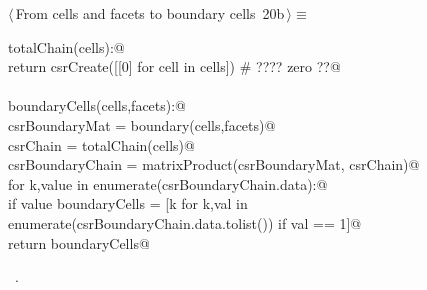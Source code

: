 \documentclass[11pt,oneside]{article}	%
\begin{document}
\begin{flushleft} \small \label{scrap36}
\protect{}$\langle\,$From cells and facets to boundary cells\nobreak\ {\footnotesize 20b}$\,\rangle\equiv$
\vspace{-1ex}
\begin{list}{}{} \item
\mbox{}\verb@def totalChain(cells):@\\
\mbox{}\verb@   return csrCreate([[0] for cell in cells])  # ????  zero ??@\\
\mbox{}\verb@@\\
\mbox{}\verb@def boundaryCells(cells,facets):@\\
\mbox{}\verb@   csrBoundaryMat = boundary(cells,facets)@\\
\mbox{}\verb@   csrChain = totalChain(cells)@\\
\mbox{}\verb@   csrBoundaryChain = matrixProduct(csrBoundaryMat, csrChain)@\\
\mbox{}\verb@   for k,value in enumerate(csrBoundaryChain.data):@\\
\mbox{}\verb@      if value % 2 == 0: csrBoundaryChain.data[k] = 0@\\
\mbox{}\verb@   boundaryCells = [k for k,val in enumerate(csrBoundaryChain.data.tolist()) if val == 1]@\\
\mbox{}\verb@   return boundaryCells@\\
\mbox{}\verb@@{\NWsep}
\end{list}
\vspace{-1ex}
\footnotesize\addtolength{\baselineskip}{-1ex}
\begin{list}{}{\setlength{\itemsep}{-\parsep}\setlength{\itemindent}{-\leftmargin}}
\item \NWtxtMacroRefIn\ .
\end{list}
\end{flushleft}
\end{document}
